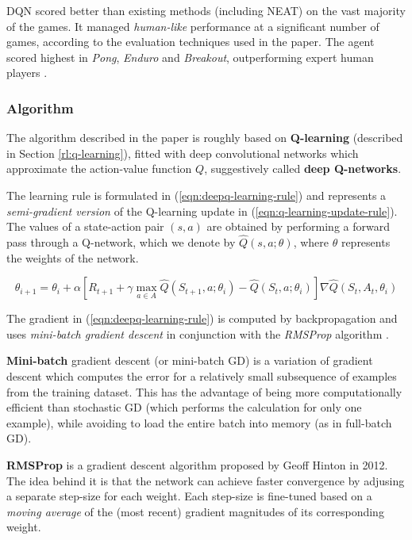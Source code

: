 DQN scored better than existing methods (including NEAT\footnotemark) on the vast majority of the games.
It managed \emph{human-like} performance at a significant number of games, according to the evaluation techniques used in the paper.
The agent scored highest in \emph{Pong}, \emph{Enduro} and \emph{Breakout}, outperforming expert human players \cite{ale-paper}.

\subsubsection{Algorithm}
The algorithm described in the paper is roughly based on \textbf{Q-learning} (described in Section \ref{rl:q-learning}), fitted with deep convolutional networks which approximate the action-value function $Q$, suggestively called \textbf{deep Q-networks}.

The learning rule is formulated in (\ref{eqn:deepq-learning-rule}) and represents a \emph{semi-gradient version} of the Q-learning update in (\ref{eqn:q-learning-update-rule}).
The values of a state-action pair $(s, a)$ are obtained by performing a forward pass through a Q-network, which we denote by $\hat{Q}(s, a; \theta)$, where $\theta$ represents the weights of the network.

\begin{equation} \label{eqn:deepq-learning-rule}
    \theta_{i + 1} = \theta_{i} + \alpha [
        R_{t+1}
        + \gamma \max_{a \in A}{\hat{Q}(S_{t+1}, a; \theta_{i})}
        - \hat{Q}(S_{t}, a; \theta_{i})
    ]
    \nabla{\hat{Q}(S_t, A_t, \theta_{i})}
\end{equation}

The gradient in (\ref{eqn:deepq-learning-rule}) is computed by backpropagation and uses \emph{mini-batch gradient descent} in conjunction with the \emph{RMSProp} algorithm \cite{atari-dqn}.

\textbf{Mini-batch} gradient descent (or mini-batch GD) is a variation of gradient descent which computes the error for a relatively small subsequence of examples from the training dataset.
This has the advantage of being more computationally efficient than stochastic GD (which performs the calculation for only one example), while avoiding to load the entire batch into memory (as in full-batch GD).

\textbf{RMSProp} is a gradient descent algorithm proposed by Geoff Hinton in 2012.
The idea behind it is that the network can achieve faster convergence by adjusing a separate step-size for each weight.
Each step-size is fine-tuned based on a \emph{moving average} of the (most recent) gradient magnitudes of its corresponding weight.

